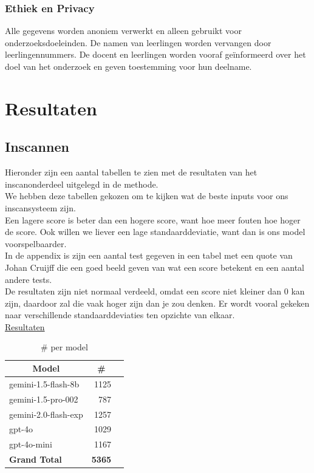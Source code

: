 \documentclass[12pt]{article}
\begin{document}
\subsubsection*{Ethiek en Privacy}
Alle gegevens worden anoniem verwerkt en alleen gebruikt voor onderzoeksdoeleinden. De namen van leerlingen worden vervangen door leerlingennummers. De docent en leerlingen worden vooraf geïnformeerd over het doel van het onderzoek en geven toestemming voor hun deelname.




\pagebreak
\section{Resultaten}
\subsection{Inscannen}
\noindent Hieronder zijn een aantal tabellen te zien met de resultaten van het inscanonderdeel uitgelegd in de methode. \\
We hebben deze tabellen gekozen om te kijken wat de beste inputs voor ons inscansysteem zijn. \\
Een lagere score is beter dan een hogere score, want hoe meer fouten hoe hoger de score. Ook willen we liever een lage standaarddeviatie, want dan is ons model voorspelbaarder. \\
In de appendix is zijn een aantal test gegeven in een tabel met een quote van Johan Cruijff die een goed beeld geven van wat een score betekent en een aantal andere tests.\\
De resultaten zijn niet normaal verdeeld, omdat een score niet kleiner dan 0 kan zijn, daardoor zal die vaak hoger zijn dan je zou denken. Er wordt vooral gekeken naar verschillende standaarddeviaties ten opzichte van elkaar. 
\\
\noindent\href{https://docs.google.com/spreadsheets/d/1wbHiG81i-UJ18s6gP3i_WtsPD-FBQTqg7AwNjN8Rm2g}{Resultaten}

\noindent\begin{table}[H]
\caption{\# per model}
\label{fig:count-model}
\begin{tabularx}{\textwidth}{X *2{r}}
    \toprule
    \multicolumn{1}{c}{\textbf{Model}} & \multicolumn{1}{c}{\textbf{\#}} \\  %
    \midrule
    gemini-1.5-flash-8b & 1125 \\
    gemini-1.5-pro-002 & 787 \\
    gemini-2.0-flash-exp & 1257 \\
    gpt-4o & 1029 \\
    gpt-4o-mini & 1167 \\
    \midrule
    \textbf{Grand Total} & \textbf{5365} \\
    \bottomrule
    
\end{tabularx}%
\end{table}
\end{document}
